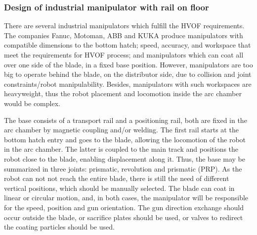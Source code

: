 \subsubsection{Design of industrial manipulator with rail on
floor}\label{proj_manip}
There are several industrial manipulators which fulfill the HVOF requirements.
The companies Fanuc, Motoman, ABB and KUKA produce manipulators with compatible
dimensions to the bottom hatch; speed, accuracy, and workspace that meet the
requirements for HVOF process; and manipulators which can coat all over one side
of the blade, in a fixed base position. However, manipulators are too big to
operate behind the blade, on the distributor side, due to collision and joint
constraints/robot manipulability. Besides, manipulators with such workspaces are
heavyweight, thus the robot placement and locomotion inside the arc chamber
would be complex.


The base consists of a transport rail and a positioning rail, both are fixed
in the arc chamber by magnetic coupling and/or welding. The first rail starts at
the bottom hatch entry and goes to the blade, allowing the locomotion of the
robot in the arc chamber. The latter is coupled to the main track and positions
the robot close to the blade, enabling displacement along it. Thus, the
base may be summarized in three joints: prismatic, revolution and prismatic (PRP). As the robot
can not not reach the entire blade, there is still the need of different
vertical positions, which should be manually selected. The blade can coat in
linear or circular motion, and, in both cases, the manipulator will be
responsible for the speed, position and gun orientation. The gun direction
exchange should occur outside the blade, or sacrifice plates should be used, or
valves to redirect the coating particles should be used.

